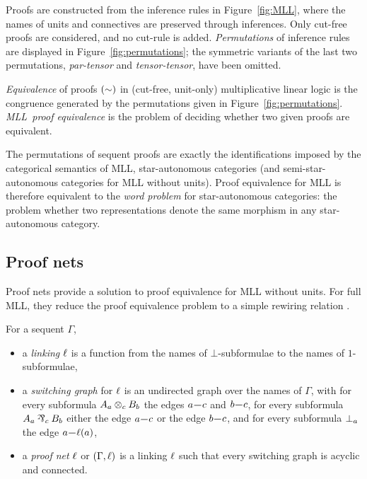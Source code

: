 \documentclass[conference]{IEEEtran}
\let\aftersubsection=\noindent
\let\capsabbrev=\uppercase
\begin{document}
Proofs are constructed from the inference rules in Figure~\ref{fig:MLL}, where the names of units and connectives are preserved through inferences.
%
Only cut-free proofs are considered, and no cut-rule is added.
%
\emph{Permutations} of inference rules are displayed in Figure~\ref{fig:permutations}; the symmetric variants of the last two permutations, \emph{par-tensor} and \emph{tensor-tensor}, have been omitted.



\begin{definition}
\label{def:equivalence}
%
\emph{Equivalence} of proofs $(\perm)$ in (cut-free, unit-only) multiplicative linear logic is the congruence generated by the permutations given in Figure~\ref{fig:permutations}.
%
\emph{\capsabbrev{mll}\ proof equivalence} is the problem of deciding whether two given proofs are equivalent.
%
\end{definition}


The permutations of sequent proofs are exactly the identifications imposed by the categorical semantics of \capsabbrev{mll}, star-autonomous categories \cite{Barr-1991} (and semi-star-autonomous categories \cite{Houston-2008,Heijltjes-Strassburger} for \capsabbrev{mll} without units).
%
Proof equivalence for \capsabbrev{mll} is therefore equivalent to the \emph{word problem} for star-autonomous categories: the problem whether two representations denote the same morphism in any star-autonomous category.



\subsection*{Proof nets}

\aftersubsection
Proof nets provide a solution to proof equivalence for \capsabbrev{mll} without units.
%
For full \capsabbrev{mll}, they reduce the proof equivalence problem to a simple rewiring relation \cite{HughesMLLProofNets}.


\begin{definition}
\label{def:proof nets}
%
For a sequent $\Gamma$,
\begin{itemize}

	\item
	a \emph{linking} $\links$ is a function from the names of $\bot$-subformulae to the names of $1$-subformulae,

	\item
	a \emph{switching graph} for $\links$ is an undirected graph over the names of $\Gamma$, with for every subformula $\named aA\named c\tn\named bB$ the edges $\edge ac$ and $\edge bc$, for every subformula $\named aA\named c\parr\named bB$ either the edge $\edge ac$ or the edge $\edge bc$, and for every subformula $\named a\bot$ the edge $\edge a{\links(a)}$,

 	\item
	a \emph{proof net} $\links$ or $(\Gamma,\links)$ is a linking $\links$ such that every switching graph is acyclic and connected.

\end{itemize}
\end{definition}
\end{document}
